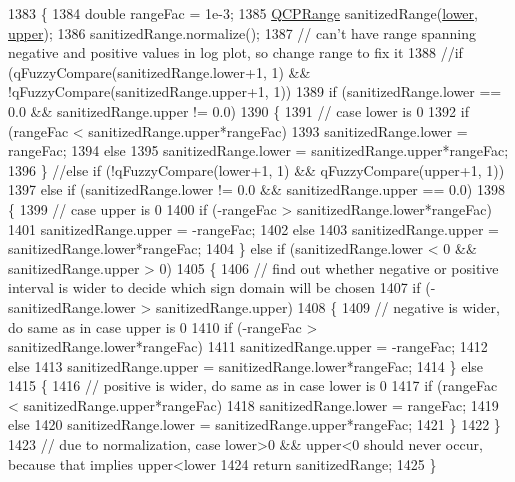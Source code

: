 \begin{DoxyCode}
1383 \{
1384   \textcolor{keywordtype}{double} rangeFac = 1e-3;
1385   \hyperlink{class_q_c_p_range}{QCPRange} sanitizedRange(\hyperlink{class_q_c_p_range_aa3aca3edb14f7ca0c85d912647b91745}{lower}, \hyperlink{class_q_c_p_range_ae44eb3aafe1d0e2ed34b499b6d2e074f}{upper});
1386   sanitizedRange.normalize();
1387   \textcolor{comment}{// can't have range spanning negative and positive values in log plot, so change range to fix it}
1388   \textcolor{comment}{//if (qFuzzyCompare(sanitizedRange.lower+1, 1) && !qFuzzyCompare(sanitizedRange.upper+1, 1))}
1389   \textcolor{keywordflow}{if} (sanitizedRange.lower == 0.0 && sanitizedRange.upper != 0.0)
1390   \{
1391     \textcolor{comment}{// case lower is 0}
1392     \textcolor{keywordflow}{if} (rangeFac < sanitizedRange.upper*rangeFac)
1393       sanitizedRange.lower = rangeFac;
1394     \textcolor{keywordflow}{else}
1395       sanitizedRange.lower = sanitizedRange.upper*rangeFac;
1396   \} \textcolor{comment}{//else if (!qFuzzyCompare(lower+1, 1) && qFuzzyCompare(upper+1, 1))}
1397   \textcolor{keywordflow}{else} \textcolor{keywordflow}{if} (sanitizedRange.lower != 0.0 && sanitizedRange.upper == 0.0)
1398   \{
1399     \textcolor{comment}{// case upper is 0}
1400     \textcolor{keywordflow}{if} (-rangeFac > sanitizedRange.lower*rangeFac)
1401       sanitizedRange.upper = -rangeFac;
1402     \textcolor{keywordflow}{else}
1403       sanitizedRange.upper = sanitizedRange.lower*rangeFac;
1404   \} \textcolor{keywordflow}{else} \textcolor{keywordflow}{if} (sanitizedRange.lower < 0 && sanitizedRange.upper > 0)
1405   \{
1406     \textcolor{comment}{// find out whether negative or positive interval is wider to decide which sign domain will be chosen}
1407     \textcolor{keywordflow}{if} (-sanitizedRange.lower > sanitizedRange.upper)
1408     \{
1409       \textcolor{comment}{// negative is wider, do same as in case upper is 0}
1410       \textcolor{keywordflow}{if} (-rangeFac > sanitizedRange.lower*rangeFac)
1411         sanitizedRange.upper = -rangeFac;
1412       \textcolor{keywordflow}{else}
1413         sanitizedRange.upper = sanitizedRange.lower*rangeFac;
1414     \} \textcolor{keywordflow}{else}
1415     \{
1416       \textcolor{comment}{// positive is wider, do same as in case lower is 0}
1417       \textcolor{keywordflow}{if} (rangeFac < sanitizedRange.upper*rangeFac)
1418         sanitizedRange.lower = rangeFac;
1419       \textcolor{keywordflow}{else}
1420         sanitizedRange.lower = sanitizedRange.upper*rangeFac;
1421     \}
1422   \}
1423   \textcolor{comment}{// due to normalization, case lower>0 && upper<0 should never occur, because that implies upper<lower}
1424   \textcolor{keywordflow}{return} sanitizedRange;
1425 \}
\end{DoxyCode}


